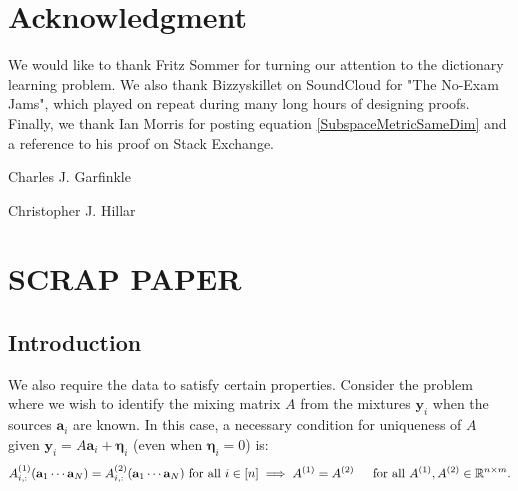 \documentclass[journal, onecolumn]{IEEEtran}
\begin{document}

\section*{Acknowledgment}
We would like to thank Fritz Sommer for turning our attention to the dictionary learning problem. We also thank Bizzyskillet on SoundCloud for "The No-Exam Jams", which played on repeat during many long hours of designing proofs. Finally, we thank Ian Morris for posting equation \eqref{SubspaceMetricSameDim} and a reference to his proof on Stack Exchange. 






\begin{IEEEbiographynophoto}{Charles J. Garfinkle}
\end{IEEEbiographynophoto}

\begin{IEEEbiographynophoto}{Christopher J. Hillar}
\end{IEEEbiographynophoto}


\section*{SCRAP PAPER}

      
\subsection{Introduction}

We also require the data to satisfy certain properties. Consider the problem where we wish to identify the mixing matrix $A$ from the mixtures $\mathbf{y}_i$ when the sources $\mathbf{a}_i$ are known. In this case, a necessary condition for uniqueness of $A$ given $\mathbf{y}_i = A \mathbf{a}_i + \mathbf{\eta}_i$ (even when $\mathbf{\eta}_i=0$) is:
\begin{align}\label{SparkCondition2}
A^{(1)}_{i,:}(\mathbf{a}_1 \cdots \mathbf{a}_N) = A^{(2)}_{i,:}(\mathbf{a}_1 \cdots \mathbf{a}_N)  \text{ for all } i \in [n] \implies A^{(1)}  = A^{(2)} \indent \text{for all } A^{(1)}, A^{(2)} \in \mathbb{R}^{n \times m}.
\end{align}
\end{document}
